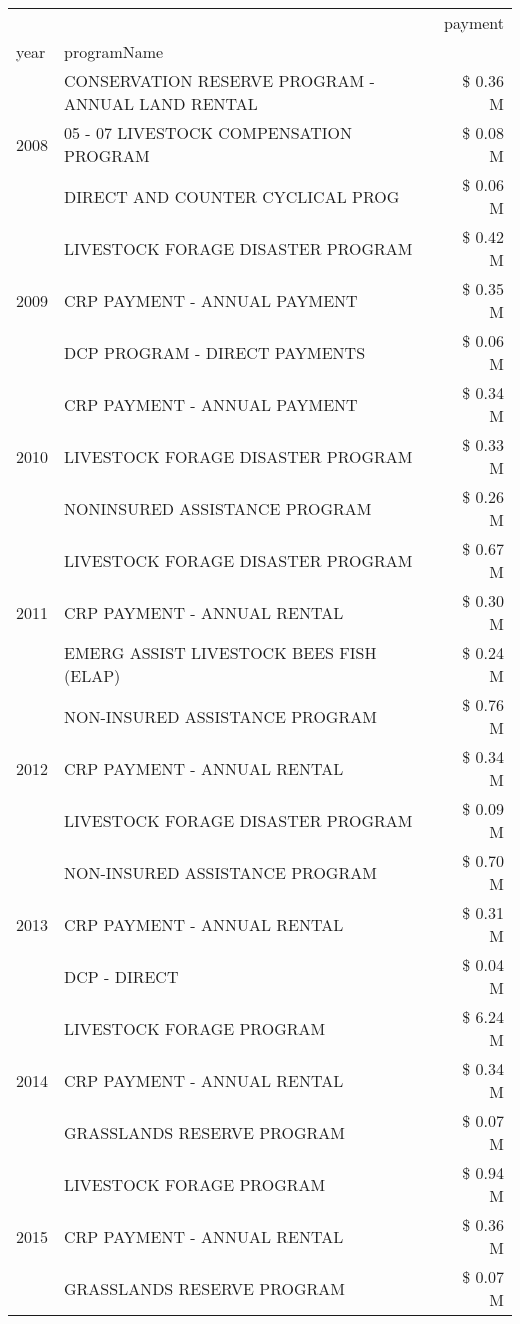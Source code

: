 \begin{tabular}{llr}
\toprule
 &  & payment \\
year & programName &  \\
\midrule
\multirow[t]{3}{*}{2008} & CONSERVATION RESERVE PROGRAM - ANNUAL LAND RENTAL & \$ 0.36 M \\
 & 05 - 07 LIVESTOCK COMPENSATION PROGRAM & \$ 0.08 M \\
 & DIRECT AND COUNTER CYCLICAL PROG & \$ 0.06 M \\
\cline{1-3}
\multirow[t]{3}{*}{2009} & LIVESTOCK FORAGE DISASTER  PROGRAM & \$ 0.42 M \\
 & CRP PAYMENT - ANNUAL PAYMENT & \$ 0.35 M \\
 & DCP PROGRAM - DIRECT PAYMENTS & \$ 0.06 M \\
\cline{1-3}
\multirow[t]{3}{*}{2010} & CRP PAYMENT - ANNUAL PAYMENT & \$ 0.34 M \\
 & LIVESTOCK FORAGE DISASTER  PROGRAM & \$ 0.33 M \\
 & NONINSURED ASSISTANCE PROGRAM & \$ 0.26 M \\
\cline{1-3}
\multirow[t]{3}{*}{2011} & LIVESTOCK FORAGE DISASTER PROGRAM & \$ 0.67 M \\
 & CRP PAYMENT - ANNUAL RENTAL & \$ 0.30 M \\
 & EMERG ASSIST LIVESTOCK BEES FISH (ELAP) & \$ 0.24 M \\
\cline{1-3}
\multirow[t]{3}{*}{2012} & NON-INSURED ASSISTANCE PROGRAM & \$ 0.76 M \\
 & CRP PAYMENT - ANNUAL RENTAL & \$ 0.34 M \\
 & LIVESTOCK FORAGE DISASTER PROGRAM & \$ 0.09 M \\
\cline{1-3}
\multirow[t]{3}{*}{2013} & NON-INSURED ASSISTANCE PROGRAM & \$ 0.70 M \\
 & CRP PAYMENT - ANNUAL RENTAL & \$ 0.31 M \\
 & DCP - DIRECT & \$ 0.04 M \\
\cline{1-3}
\multirow[t]{3}{*}{2014} & LIVESTOCK FORAGE PROGRAM & \$ 6.24 M \\
 & CRP PAYMENT - ANNUAL RENTAL & \$ 0.34 M \\
 & GRASSLANDS RESERVE PROGRAM & \$ 0.07 M \\
\cline{1-3}
\multirow[t]{3}{*}{2015} & LIVESTOCK FORAGE PROGRAM & \$ 0.94 M \\
 & CRP PAYMENT - ANNUAL RENTAL & \$ 0.36 M \\
 & GRASSLANDS RESERVE PROGRAM & \$ 0.07 M \\

\end{tabular}
